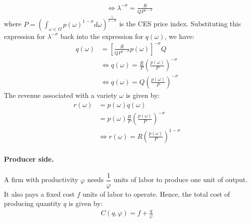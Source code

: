 \begin{solution}
\begin{align*}
        &\iff \lambda^{-\sigma} = \frac{R}{Q P^{1 - \sigma}} 
    \end{align*}
    where $P = \left( \int_{\omega \in \Omega} p(\omega)^{1 - \sigma} d\omega \right)^{\frac{1}{1 - \sigma}}$ is the CES price index. Substituting this expression for $\lambda^{-\sigma}$ back into the expression for $q(\omega)$, we have:
    \begin{align*}
        q(\omega) &= \left[ \frac{R}{Q P^{1 - \sigma}} p(\omega) \right]^{-\sigma} Q \\
        &\iff q(\omega) = \frac{R}{P} \left( \frac{p(\omega)}{P} \right)^{-\sigma}\\
        &\iff q(\omega) = Q \left( \frac{p(\omega)}{P} \right)^{-\sigma}
    \end{align*}
    The revenue associated with a variety $\omega$ is given by:
    \begin{align*}
        r(\omega) &= p(\omega) q(\omega) \\
        &= p(\omega) \frac{R}{P} \left( \frac{p(\omega)}{P} \right)^{-\sigma} \\
        &\iff r(\omega) = R \left( \frac{p(\omega)}{P} \right)^{1 - \sigma}
    \end{align*}
    
    \paragraph{Producer side.} A firm with productivity $\varphi$ needs $\dfrac{1}{\varphi}$ units of labor to produce one unit of output. It also pays a fixed cost $f$ units of labor to operate. Hence, the total cost of producing quantity $q$ is given by:
    \begin{align*}
        C(q, \varphi) = f + \frac{q}{\varphi} 
    \end{align*}
    

\end{solution}
